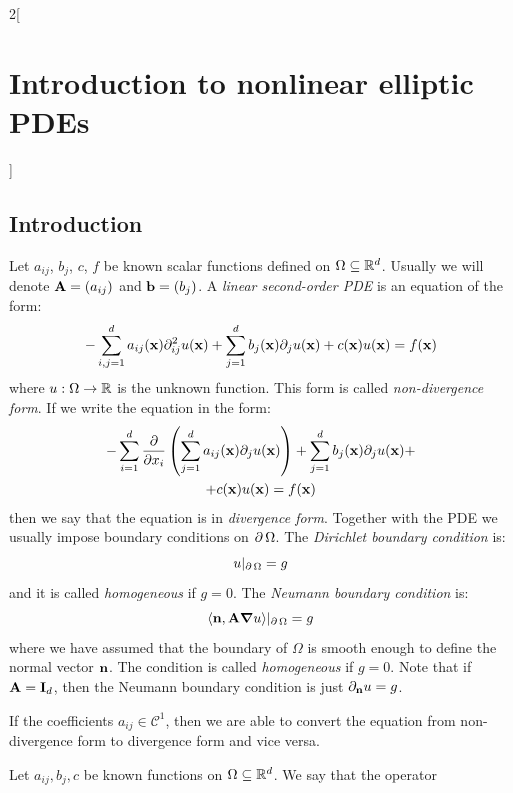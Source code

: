 \documentclass[../../../main_math.tex]{subfiles}
\begin{document}
\begin{multicols}{2}[\section{Introduction to nonlinear elliptic PDEs}]
  \subsection{Introduction}
  \begin{definition}
    Let $a_{ij}$, $b_j$, $c$, $f$ be known scalar functions defined on $\Omega\subseteq \mathbb{R}^d$. Usually we will denote $\boldsymbol{\mathrm{A}}=(a_{ij})$ and $\boldsymbol{\mathrm{b}}=(b_j)$. A \emph{linear second-order PDE} is an equation of the form:
    \begin{equation*}
      -\sum_{i,j=1}^da_{ij}(\boldsymbol{\mathrm{x}})\partial_{ij}^2u(\boldsymbol{\mathrm{x}})+\sum_{j=1}^db_j(\boldsymbol{\mathrm{x}})\partial_ju(\boldsymbol{\mathrm{x}})+c(\boldsymbol{\mathrm{x}})u(\boldsymbol{\mathrm{x}})=f(\boldsymbol{\mathrm{x}})
    \end{equation*}
    where $u:\Omega\to \mathbb{R}$ is the unknown function. This form is called \emph{non-divergence form}. If we write the equation in the form:
    \begin{multline*}
      -\sum_{i=1}^d\pdv{}{x_i}\left(\sum_{j=1}^da_{ij}(\boldsymbol{\mathrm{x}})\partial_ju(\boldsymbol{\mathrm{x}})\right)+\sum_{j=1}^db_j(\boldsymbol{\mathrm{x}})\partial_ju(\boldsymbol{\mathrm{x}})+\\+c(\boldsymbol{\mathrm{x}})u(\boldsymbol{\mathrm{x}})=f(\boldsymbol{\mathrm{x}})
    \end{multline*}
    then we say that the equation is in \emph{divergence form}. Together with the PDE we usually impose boundary conditions on $\operatorname{\partial}{\Omega}$. The \emph{Dirichlet boundary condition} is:
    $$
      u|_{\operatorname{\partial}{\Omega}}=g
    $$
    and it is called \emph{homogeneous} if $g=0$. The \emph{Neumann boundary condition} is:
    $$
      \langle \boldsymbol{\mathrm{n}},\boldsymbol{\mathrm{A}} \grad u\rangle|_{\operatorname{\partial}{\Omega}}=g
    $$
    where we have assumed that the boundary of $\Omega$ is smooth enough to define the normal vector $\boldsymbol{\mathrm{n}}$. The condition is called \emph{homogeneous} if $g=0$. Note that if $\boldsymbol{\mathrm{A}}=\boldsymbol{\mathrm{I}}_d$, then the Neumann boundary condition is just $\partial_{\boldsymbol{\mathrm{n}}} u=g$.
  \end{definition}
  \begin{remark}
    If the coefficients $a_{ij}\in\mathcal{C}^1$, then we are able to convert the equation from non-divergence form to divergence form and vice versa.
  \end{remark}
  \begin{definition}
    Let $a_{ij},b_j,c$ be known functions on $\Omega\subseteq \mathbb{R}^d$. We say that the operator

\end{definition}
\end{multicols}
\end{document}
